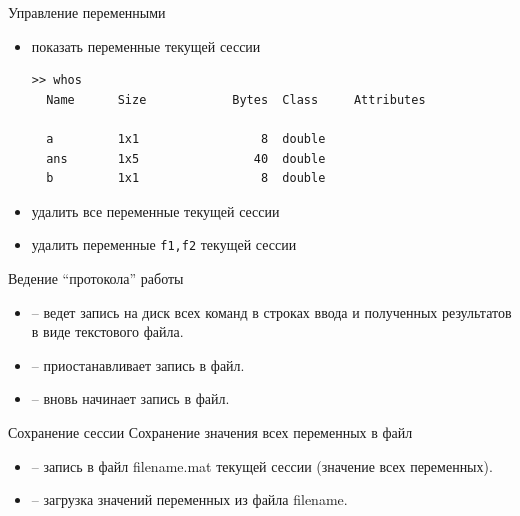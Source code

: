 \documentclass[11pt, compress]{beamer}
\begin{document}


\begin{frame}[fragile]{Управление переменными}
  \begin{itemize}
    \item {} показать переменные текущей сессии
\begin{lstlisting}
>> whos
  Name      Size            Bytes  Class     Attributes

  a         1x1                 8  double              
  ans       1x5                40  double              
  b         1x1                 8  double              
\end{lstlisting}
    \item {} удалить все переменные текущей сессии
    \item {} удалить переменные \verb|f1,f2| текущей сессии 
  \end{itemize}
\end{frame}

\begin{frame}[fragile]{Ведение ``протокола'' работы}  
  \begin{itemize}
    \item {} -- ведет запись на диск всех команд в строках ввода и полученных результатов в виде текстового файла.
    \item {} -- приостанавливает запись в файл.
    \item {} --  вновь начинает запись в файл.
  \end{itemize}  
\end{frame}

\begin{frame}[fragile]{Сохранение сессии}  
  Сохранение значения всех переменных в файл 
  \begin{itemize}
    \item {} -- запись в файл \alert{filename.mat} текущей сессии (значение всех переменных).
    \item {} -- загрузка значений переменных из файла \alert{filename}.
  \end{itemize}
\end{frame}
\end{document}
